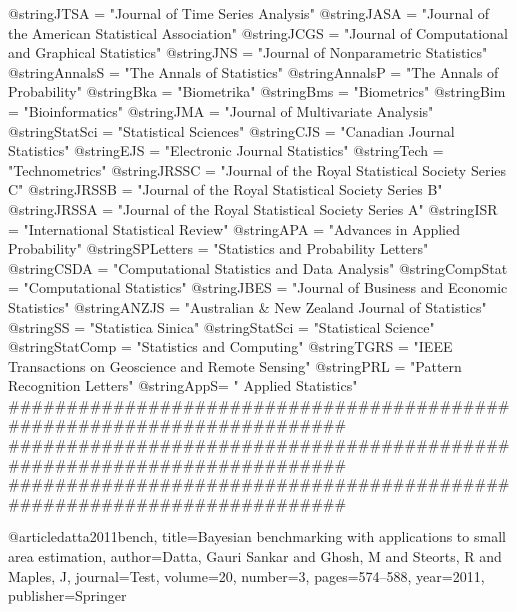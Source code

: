 @string{JTSA = "Journal of Time Series Analysis"}
@string{JASA = "Journal of the American Statistical Association"}
@string{JCGS = "Journal of Computational and Graphical Statistics"}
@string{JNS = "Journal of Nonparametric Statistics"}
@string{AnnalsS = "The Annals of Statistics"}
@string{AnnalsP = "The Annals of Probability"}
@string{Bka = "Biometrika"}
@string{Bms = "Biometrics"}
@string{Bim = "Bioinformatics"}
@string{JMA = "Journal of Multivariate Analysis"}
@string{StatSci = "Statistical Sciences"}
@string{CJS = "Canadian Journal Statistics"}
@string{EJS = "Electronic Journal Statistics"}
@string{Tech = "Technometrics"}
@string{JRSSC = "Journal of the Royal Statistical Society Series C"}
@string{JRSSB = "Journal of the Royal Statistical Society Series B"}
@string{JRSSA = "Journal of the Royal Statistical Society Series A"}
@string{ISR = "International Statistical Review"}
@string{APA = "Advances in Applied Probability"}
@string{SPLetters = "Statistics and Probability Letters"}
@string{CSDA = "Computational Statistics and Data Analysis"}
@string{CompStat = "Computational Statistics"}
@string{JBES = "Journal of Business and Economic Statistics"}
@string{ANZJS = "Australian \& New Zealand Journal of Statistics"}
@string{SS = "Statistica Sinica"}
@string{StatSci = "Statistical Science"}
@string{StatComp = "Statistics and Computing"}
@string{TGRS = "IEEE Transactions on Geoscience and Remote Sensing"}
@string{PRL = "Pattern Recognition Letters"}
@string{AppS= " Applied Statistics"}
########################################################################
########################################################################
########################################################################

@article{datta2011bench,
  title={Bayesian benchmarking with applications to small area estimation},
  author={Datta, Gauri Sankar and Ghosh, M and Steorts, R and Maples, J},
  journal={Test},
  volume={20},
  number={3},
  pages={574--588},
  year={2011},
  publisher={Springer}
}